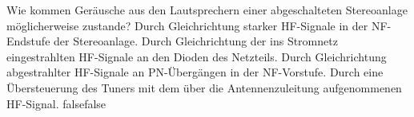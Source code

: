     {Wie kommen Geräusche aus den Lautsprechern einer abgeschalteten Stereoanlage möglicherweise zustande?}
    {Durch Gleichrichtung starker HF-Signale in der NF-Endstufe der Stereoanlage.}
    {Durch Gleichrichtung der ins Stromnetz eingestrahlten HF-Signale an den Dioden des Netzteils.}
    {Durch Gleichrichtung abgestrahlter HF-Signale an PN-Übergängen in der NF-Vorstufe.}
    {Durch eine Übersteuerung des Tuners mit dem über die Antennenzuleitung aufgenommenen HF-Signal.}
    {false}{false}